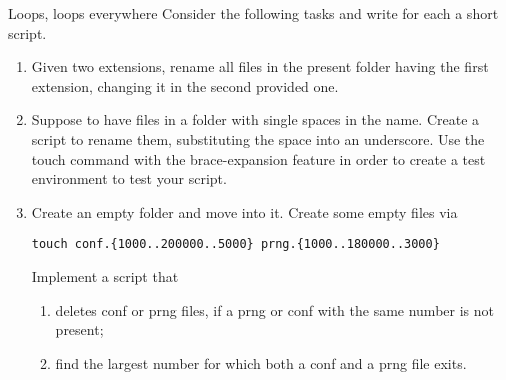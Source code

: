 
\begin{exercise}[Instructive]{Loops, loops everywhere}
    Consider the following tasks and write for each a short script.
    \begin{enumerate}[after=\vspace{-0.6\baselineskip}]
        \item Given two extensions, rename all files in the present folder having the first extension, changing it in the second provided one.
        \item Suppose to have files in a folder with single spaces in the name. Create a script to rename them, substituting the space into an underscore.
              Use the touch command with the brace-expansion feature in order to create a test environment to test your script.
        \item Create an empty folder and move into it.
              Create some empty files via
              \begin{lstlisting}[style=MyBash, numbers=none]
                  touch conf.{1000..200000..5000} prng.{1000..180000..3000}
              \end{lstlisting}
              Implement a script that
              \begin{enumerate}[after=\vspace{-0.6\baselineskip}]
                  \item deletes conf or prng files, if a prng or conf with the same number is not present;
                  \item find the largest number for which both a conf and a prng file exits.
              \end{enumerate}
    \end{enumerate}
\end{exercise}
